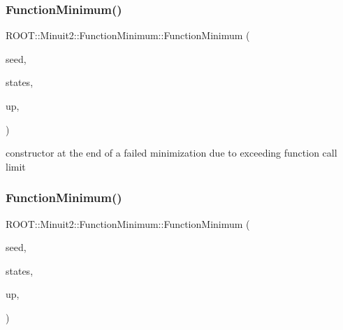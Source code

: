 \mbox{\label{classROOT_1_1Minuit2_1_1FunctionMinimum_aa68c6d1a70d47537fef4990cd797ebc0}} 
\subsubsection{\texorpdfstring{FunctionMinimum()}{FunctionMinimum()}\hspace{0.1cm}{\footnotesize\ttfamily [8/10]}}
{\footnotesize\ttfamily R\+O\+O\+T\+::\+Minuit2\+::\+Function\+Minimum\+::\+Function\+Minimum (\begin{DoxyParamCaption}\item[{const \mbox{\hyperlink{classROOT_1_1Minuit2_1_1MinimumSeed}{Minimum\+Seed}} \&}]{seed,  }\item[{const std\+::vector$<$ \mbox{\hyperlink{classROOT_1_1Minuit2_1_1MinimumState}{Minimum\+State}} $>$ \&}]{states,  }\item[{double}]{up,  }\item[{\mbox{\hyperlink{classROOT_1_1Minuit2_1_1FunctionMinimum_1_1MnReachedCallLimit}{Mn\+Reached\+Call\+Limit}}}]{ }\end{DoxyParamCaption})\hspace{0.3cm}{\ttfamily [inline]}}



constructor at the end of a failed minimization due to exceeding function call limit 

\mbox{\label{classROOT_1_1Minuit2_1_1FunctionMinimum_a70961c8a405bd4298247c9b353804154}} 
\subsubsection{\texorpdfstring{FunctionMinimum()}{FunctionMinimum()}\hspace{0.1cm}{\footnotesize\ttfamily [9/10]}}
{\footnotesize\ttfamily R\+O\+O\+T\+::\+Minuit2\+::\+Function\+Minimum\+::\+Function\+Minimum (\begin{DoxyParamCaption}\item[{const \mbox{\hyperlink{classROOT_1_1Minuit2_1_1MinimumSeed}{Minimum\+Seed}} \&}]{seed,  }\item[{const std\+::vector$<$ \mbox{\hyperlink{classROOT_1_1Minuit2_1_1MinimumState}{Minimum\+State}} $>$ \&}]{states,  }\item[{double}]{up,  }\item[{\mbox{\hyperlink{classROOT_1_1Minuit2_1_1FunctionMinimum_1_1MnAboveMaxEdm}{Mn\+Above\+Max\+Edm}}}]{ }\end{DoxyParamCaption})\hspace{0.3cm}{\ttfamily [inline]}}



